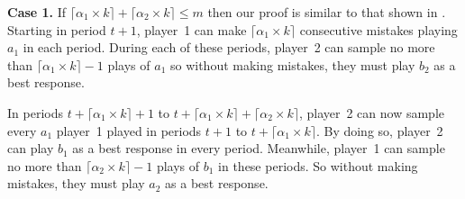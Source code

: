 \documentclass[11.5pt]{article}
\begin{document}

{\bf Case 1.} If $\lceil \alpha_1 \times k \rceil + \lceil \alpha_2 \times k \rceil \leq m$ then our proof is similar to that shown in \cite{Young1998}. Starting in period $t+1$, player~1 can make $\lceil \alpha_1 \times k \rceil$ consecutive mistakes playing $a_1$ in each period. During each of these periods, player~2 can sample no more than $\lceil \alpha_1 \times k \rceil - 1$ plays of $a_1$ so without making mistakes, they must play $b_2$ as a best response.

In periods $t+\lceil \alpha_1 \times k \rceil + 1$ to $t + \lceil \alpha_1 \times k \rceil + \lceil \alpha_2 \times k \rceil$, player~2 can now sample every $a_1$ player~1 played in periods $t+1$ to $t+\lceil \alpha_1 \times k \rceil$. By doing so, player~2 can play $b_1$ as a best response in every period. Meanwhile, player~1 can sample no more than $\lceil \alpha_2 \times k \rceil - 1$ plays of $b_1$ in these periods. So without making mistakes, they must play $a_2$ as a best response.
\end{document}
